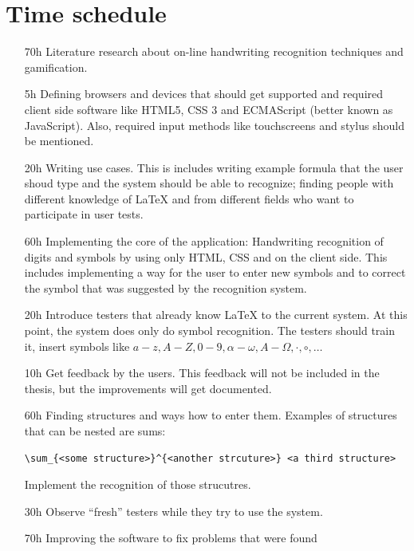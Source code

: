 \documentclass[a4paper]{scrartcl}
\begin{document}
\section{Time schedule}
\begin{itemize}
    \item[70h] Literature research about on-line handwriting recognition 
               techniques and gamification.
    \item[5h]  Defining browsers and devices that should get supported
               and required client side software like HTML5, CSS 3
               and ECMAScript (better known as JavaScript). Also,
               required input methods like touchscreens and stylus
               should be mentioned.
    \item[20h] Writing use cases. This is includes writing example 
               formula that the user shoud type and the system should
               be able to recognize; finding people with different 
               knowledge of \LaTeX{} and from different fields who 
               want to participate in user tests.
    \item[60h] Implementing the core of the application: Handwriting
               recognition of digits and symbols by using only
               HTML, CSS and  on the client side. This includes implementing
               a way for the user to enter new symbols and to correct the
               symbol that was suggested by the recognition system.
    \item[20h] Introduce testers that already know \LaTeX{} to the 
               current system. At this point, the system does only do
               symbol recognition. The testers should train it, 
               insert symbols like $a-z, A-Z, 0-9, \alpha-\omega, A-\Omega, \cdot, \circ, \dots$
    \item[10h] Get feedback by the users. This feedback will not be included
               in the thesis, but the improvements will get documented.
    \item[60h] Finding structures and ways how to enter them. Examples
               of structures that can be nested are sums:
               \begin{verbatim}\sum_{<some structure>}^{<another strcuture>} <a third structure>\end{verbatim}
               Implement the recognition of those strucutres.
    \item[30h] Observe \enquote{fresh} testers while they try to use
               the system. 
    \item[70h] Improving the software to fix problems that were found

\end{itemize}
\end{document}
